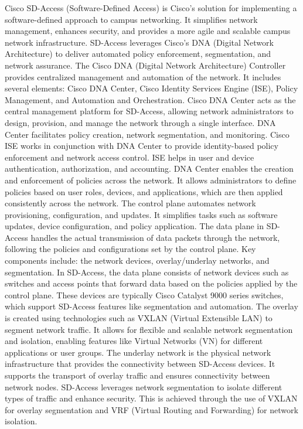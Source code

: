 \documentclass{article}
\begin{document}
	Cisco SD-Access (Software-Defined Access) is Cisco’s solution for implementing a software-defined approach to campus networking. It simplifies network management, enhances security, and provides a more agile and scalable campus network infrastructure. SD-Access leverages Cisco’s DNA (Digital Network Architecture) to deliver automated policy enforcement, segmentation, and network assurance. The Cisco DNA (Digital Network Architecture) Controller provides centralized management and automation of the network. It includes several elements: Cisco DNA Center, Cisco Identity Services Engine (ISE), Policy Management, and Automation and Orchestration. Cisco DNA Center acts as the central management platform for SD-Access, allowing network administrators to design, provision, and manage the network through a single interface. DNA Center facilitates policy creation, network segmentation, and monitoring. Cisco ISE works in conjunction with DNA Center to provide identity-based policy enforcement and network access control. ISE helps in user and device authentication, authorization, and accounting. DNA Center enables the creation and enforcement of policies across the network. It allows administrators to define policies based on user roles, devices, and applications, which are then applied consistently across the network. The control plane automates network provisioning, configuration, and updates. It simplifies tasks such as software updates, device configuration, and policy application. The data plane in SD-Access handles the actual transmission of data packets through the network, following the policies and configurations set by the control plane. Key components include: the network devices, overlay/underlay networks, and segmentation. In SD-Access, the data plane consists of network devices such as switches and access points that forward data based on the policies applied by the control plane. These devices are typically Cisco Catalyst 9000 series switches, which support SD-Access features like segmentation and automation. The overlay is created using technologies such as VXLAN (Virtual Extensible LAN) to segment network traffic. It allows for flexible and scalable network segmentation and isolation, enabling features like Virtual Networks (VN) for different applications or user groups. The underlay network is the physical network infrastructure that provides the connectivity between SD-Access devices. It supports the transport of overlay traffic and ensures connectivity between network nodes. SD-Access leverages network segmentation to isolate different types of traffic and enhance security. This is achieved through the use of VXLAN for overlay segmentation and VRF (Virtual Routing and Forwarding) for network isolation.\\
\end{document}

